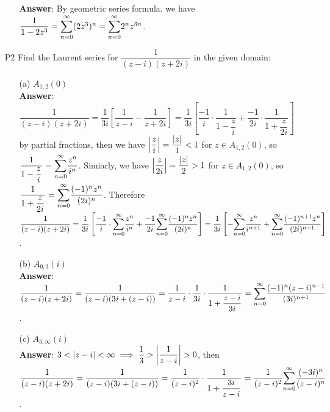 \documentclass{article}
\begin{document}
\begin{itemize}
\begin{itemize}
                        \textbf{Answer}: By geometric series formula, we have $\dfrac{1}{1-2z^3}=\mathlarger{\sum_{n=0}^\infty}(2z^3)^n=\mathlarger{\sum_{n=0}^\infty}2^nz^{3n}$.
            \end{itemize}
      \item [P2] Find the Laurent series for $\dfrac{1}{(z-i)(z+2i)}$ in the given domain:
            \begin{itemize}
                  \item [(a)] $A_{1,2}(0)$\\
                        \textbf{Answer}: $\dfrac{1}{(z-i)(z+2i)}=\dfrac{1}{3i}\left[\dfrac{1}{z-i}-\dfrac{1}{z+2i}\right]=\dfrac{1}{3i}\left[\dfrac{-1}{i}\cdot\dfrac{1}{1-\dfrac{z}{i}}+\dfrac{-1}{2i}\cdot\dfrac{1}{1+\dfrac{z}{2i}}\right]$ by partial fractions, then we have $\abs{\dfrac{z}{i}}=\dfrac{\abs{z}}{1}<1$ for $z\in A_{1,2}(0)$, so $\dfrac{1}{1-\dfrac{z}{i}}=\mathlarger{\sum_{n=0}^\infty}\dfrac{z^n}{i^n}$. Simiarly, we have $\abs{\dfrac{z}{2i}}=\dfrac{\abs{z}}{2}>1$ for $z\in A_{1,2}(0)$, so $\dfrac{1}{1+\dfrac{z}{2i}}=\mathlarger{\sum_{n=0}^\infty}\dfrac{(-1)^nz^n}{(2i)^n}$. Therefore $\dfrac{1}{(z-i)(z+2i)}=\dfrac{1}{3i}\left[\dfrac{-1}{i}\cdot\mathlarger{\sum_{n=0}^\infty}\dfrac{z^n}{i^n}+\dfrac{-1}{2i}\mathlarger{\sum_{n=0}^\infty}\dfrac{(-1)^nz^n}{(2i)^n}\right]=\dfrac{1}{3i}\left[-\mathlarger{\sum_{n=0}^\infty}\dfrac{z^n}{i^{n+1}}+\mathlarger{\sum_{n=0}^\infty}\dfrac{(-1)^{n+1}z^n}{(2i)^{n+1}}\right]$.
                  \item [(b)] $A_{0,3}(i)$\\
                        \textbf{Answer}: $\dfrac{1}{(z-i)(z+2i)}=\dfrac{1}{(z-i)(3i+(z-i))}=\dfrac{1}{z-i}\cdot\dfrac{1}{3i}\cdot\dfrac{1}{1+\dfrac{z-i}{3i}}=\mathlarger{\sum_{n=0}^\infty}\dfrac{(-1)^n(z-i)^{n-1}}{(3i)^{n+1}}$.
                  \item [(c)] $A_{3,\infty}(i)$\\
                        \textbf{Answer}: $3<\abs{z-i}<\infty\implies\dfrac{1}{3}>\abs{\dfrac{1}{z-i}}>0$, then $\dfrac{1}{(z-i)(z+2i)}=\dfrac{1}{(z-i)(3i+(z-i))}=\dfrac{1}{(z-i)^2}\cdot\dfrac{1}{1+\dfrac{3i}{z-i}}=\dfrac{1}{(z-i)^2}\mathlarger{\sum_{n=0}^\infty}\dfrac{(-3i)^n}{(z-i)^n}$.
            \end{itemize}
\end{itemize}
\end{document}
